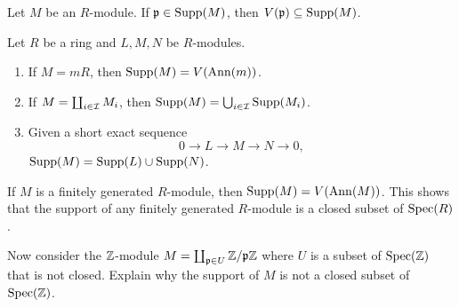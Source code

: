 \documentclass{ximera}
\begin{document}
\begin{exercise}
  Let $M$ be an $R$-module. If $\mathfrak{p}\in\operatorname{Supp}(M)$, then
  $V(\mathfrak{p})\subseteq\operatorname{Supp}(M)$.
\end{exercise}



\begin{proposition}%
  Let $R$ be a ring and $L,M,N$ be $R$-modules.
  \begin{enumerate}
  \item If $M = mR$, then $\operatorname{Supp}(M) = V(\operatorname{Ann}(m))$.
  \item If $M = \coprod_{i\in \mathcal I} M_i$, then $\operatorname{Supp}(M) = \bigcup_{i\in \mathcal I} \operatorname{Supp}(M_i)$.
  \item Given a short exact sequence
    \[
    0 \to L \to M \to N \to 0,
    \]
    $\operatorname{Supp}(M) = \operatorname{Supp}(L) \cup \operatorname{Supp}(N)$.
  \end{enumerate}
\end{proposition}

\begin{exercise}
  If $M$ is a finitely generated $R$-module, then $\operatorname{Supp}(M) = V(\operatorname{Ann}(M))$.  This
  shows that the support of any finitely generated $R$-module is a
  closed subset of $\operatorname{Spec}(R)$.

  Now consider the $\mathbb Z$-module $M = \coprod_{\mathfrak{p}\in U} \mathbb Z/\mathfrak{p}\mathbb Z$ where $U$
  is a subset of $\operatorname{Spec}(\mathbb Z)$ that is not closed. Explain why the
  support of $M$ is not a closed subset of $\operatorname{Spec}(\mathbb Z)$.
\end{exercise}





\end{document}
